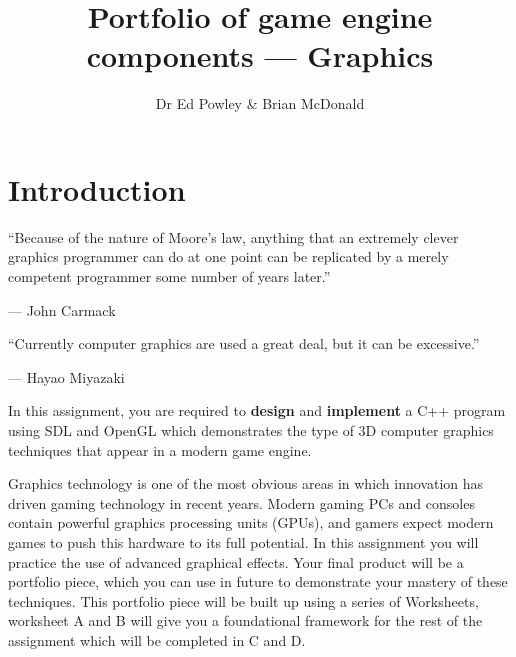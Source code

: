 \documentclass{../../fal_assignment}
\title{Portfolio of game engine components --- Graphics}
\author{Dr Ed Powley \& Brian McDonald}
\begin{document}
\maketitle

\section*{Introduction}

\begin{marginquote}
``Because of the nature of Moore's law, anything that an extremely clever graphics programmer can do at one point can be replicated by a merely competent programmer some number of years later.''

--- John Carmack

    \marginquoterule

``Currently computer graphics are used a great deal, but it can be excessive.''

--- Hayao Miyazaki
\end{marginquote}

In this assignment, you are required to \textbf{design} and \textbf{implement} a C++ program using SDL and OpenGL
which demonstrates the type of 3D computer graphics techniques that appear in a modern game engine.

Graphics technology is one of the most obvious areas in which innovation has driven gaming technology in recent years.
Modern gaming PCs and consoles contain powerful graphics processing units (GPUs),
and gamers expect modern games to push this hardware to its full potential.
In this assignment you will practice the use of advanced graphical effects.
Your final product will be a portfolio piece, which you can use in future to demonstrate your mastery of these techniques. This portfolio piece will be built up using a series of Worksheets, worksheet A and B will give you a foundational framework for
the rest of the assignment which will be completed in C and D.
\end{document}
